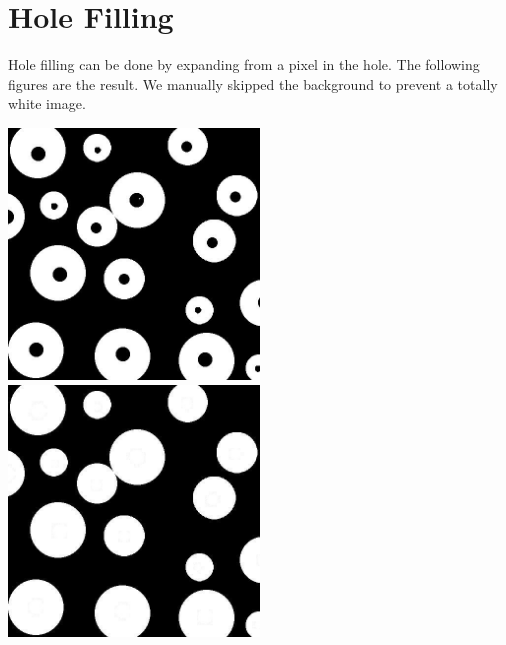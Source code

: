 \documentclass{article}
\begin{document}
\section{Hole Filling}
Hole filling can be done by expanding from a pixel in the hole. The following figures are the result. We manually skipped the background to prevent a totally white image.

\includegraphics[width=0.5\textwidth]{../data/region_filling_reflections.jpg}
\includegraphics[width=0.5\textwidth]{../data/hole_filling_region_filling_reflections.jpg}
\end{document}
